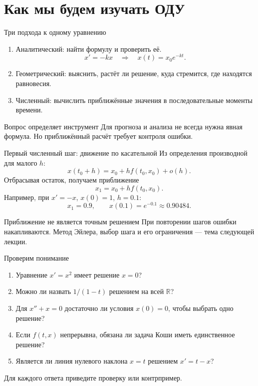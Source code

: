 \documentclass[aspectratio=169,11pt]{beamer}
\newcommand{\R}{\mathbb R}
\begin{document}
\section{Как мы будем изучать ОДУ}
\begin{frame}{Три подхода к одному уравнению}
  \begin{enumerate}
    \item \alert{Аналитический:} найти формулу и проверить её.
      \[x'=-kx\quad\Longrightarrow\quad x(t)=x_0e^{-kt}.\]
    \item \alert{Геометрический:} выяснить, растёт ли решение,
      куда стремится, где находятся равновесия.
    \item \alert{Численный:} вычислить приближённые значения
      в последовательные моменты времени.
  \end{enumerate}
  \begin{block}{Вопрос определяет инструмент}
    Для прогноза и анализа не всегда нужна явная формула.
    Но приближённый расчёт требует контроля ошибки.
  \end{block}
\end{frame}

\begin{frame}{Первый численный шаг: движение по касательной}
  Из определения производной для малого $h$:
  \[
    x(t_0+h)=x_0+h f(t_0,x_0)+o(h).
  \]
  Отбрасывая остаток, получаем приближение
  \[
    \boxed{x_1=x_0+h f(t_0,x_0)}.
  \]
  Например, при $x'=-x$, $x(0)=1$, $h=0.1$:
  \[
    x_1=0.9,\qquad x(0.1)=e^{-0.1}\approx0.90484.
  \]
  \begin{alertblock}{Приближение не является точным решением}
    При повторении шагов ошибки накапливаются. Метод Эйлера,
    выбор шага и его ограничения --- тема следующей лекции.
  \end{alertblock}
\end{frame}

\begin{frame}{Проверим понимание}
  \begin{enumerate}
    \item Уравнение $x'=x^2$ имеет решение $x=0$?
    \item Можно ли назвать $1/(1-t)$ решением на всей $\R$?
    \item Для $x''+x=0$ достаточно ли условия $x(0)=0$,
      чтобы выбрать одно решение?
    \item Если $f(t,x)$ непрерывна, обязана ли задача Коши
      иметь единственное решение?
    \item Является ли линия нулевого наклона $x=t$ решением $x'=t-x$?
  \end{enumerate}
  \medskip
  Для каждого ответа приведите проверку или контрпример.
\end{frame}
\end{document}
